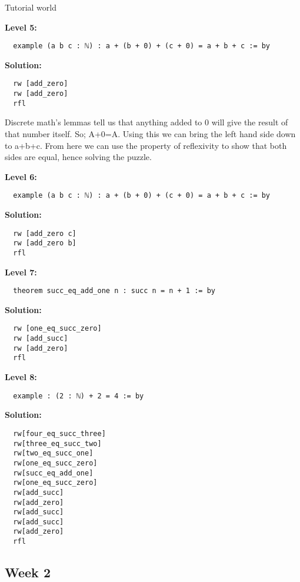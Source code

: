 \documentclass{article}
\theoremstyle{theorem}
\theoremstyle{definition}
\theoremstyle{remark}
\begin{document}
Tutorial world 
\begin{enumerate}

  \textbf{Level 5:}
  \begin{verbatim}
  example (a b c : ℕ) : a + (b + 0) + (c + 0) = a + b + c := by
  \end{verbatim}

  \textbf{Solution:}
  \begin{verbatim}
  rw [add_zero]
  rw [add_zero]
  rfl
  \end{verbatim}
  
  Discrete math's lemmas tell us that anything added to 0 will give the result of that number itself. So; A+0=A. 
  Using this we can bring the left hand side down to a+b+c. 
  From here we can use the property of reflexivity to show that both sides are equal, hence solving the puzzle. 

  \textbf{Level 6:}
  \begin{verbatim}
  example (a b c : ℕ) : a + (b + 0) + (c + 0) = a + b + c := by
  \end{verbatim}

  \textbf{Solution:}
  \begin{verbatim}
  rw [add_zero c]
  rw [add_zero b]
  rfl
  \end{verbatim}

  \textbf{Level 7:}
  \begin{verbatim}
  theorem succ_eq_add_one n : succ n = n + 1 := by
  \end{verbatim}

  \textbf{Solution:}
  \begin{verbatim}
  rw [one_eq_succ_zero]
  rw [add_succ]
  rw [add_zero]
  rfl
  \end{verbatim}

  \textbf{Level 8:}
  \begin{verbatim}
  example : (2 : ℕ) + 2 = 4 := by
  \end{verbatim}

  \textbf{Solution:}
  \begin{verbatim}
  rw[four_eq_succ_three]
  rw[three_eq_succ_two]
  rw[two_eq_succ_one]
  rw[one_eq_succ_zero]
  rw[succ_eq_add_one]
  rw[one_eq_succ_zero]
  rw[add_succ]
  rw[add_zero]
  rw[add_succ]
  rw[add_succ]
  rw[add_zero]
  rfl
  \end{verbatim}

\end{enumerate}

\subsection{Week 2}
\end{document}

